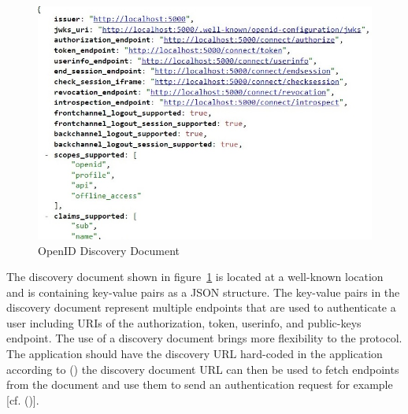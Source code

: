\begin{figure}[h]
	\centering
	\includegraphics[width=0.8\linewidth]{images/openid-discovery-document}
	\caption{OpenID Discovery Document}
	\label{fig:openid-discovery-document}
\end{figure}
The discovery document shown in figure~\ref{fig:openid-discovery-document} is located at a well-known location and is containing key-value pairs as a JSON structure. The key-value pairs in the discovery document represent multiple endpoints that are used to authenticate a user including URIs of the authorization, token, userinfo, and public-keys endpoint. The use of a discovery document brings more flexibility to the protocol. The application should have the discovery URL hard-coded in the application according to (\cite{Google:2018:IdentityPlatform}) the discovery document URL can then be used to fetch endpoints from the document and use them to send an authentication request for example [cf. (\cite{Google:2018:IdentityPlatform})].

